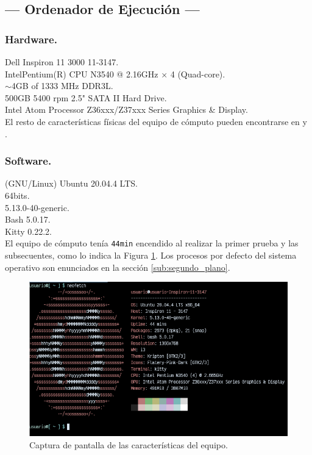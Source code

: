 \documentclass[11pt,a4paper]{article}
\begin{document}
\subsection{--- Ordenador de Ejecución ---} %
\label{sub:condiciones}
\begin{minipage}{0.5\linewidth}
	\subsubsection{Hardware.} %
	\label{subs:hardware}
	\ttfamily
	 Dell Inspiron 11 3000 11-3147. \\[2mm]
	 Intel\textregistered Pentium(R) CPU N3540 @ 2.16GHz × 4 (Quad-core). \\[2mm]
	 \(\sim\)4GB of 1333 MHz DDR3L. \\[2mm]
	 500GB 5400 rpm 2.5" SATA II Hard Drive. \\[2mm]
	 Intel Atom Processor Z36xxx/Z37xxx Series Graphics \& Display. \\[2mm]
	\normalfont
	El resto de características físicas del equipo de cómputo pueden encontrarse en  y .
\end{minipage}\hspace{5mm}
\begin{minipage}{0.5\linewidth}
	\subsubsection{Software.} %
	\label{subs:software}
	\ttfamily
	 (GNU/Linux) Ubuntu 20.04.4 LTS.\\[2mm]
	 64bits.\\[2mm]
	 5.13.0-40-generic.\\[2mm]
	 Bash 5.0.17.\\[2mm]
	 Kitty 0.22.2.\\[2mm]
	\normalfont
	El equipo de cómputo tenía \texttt{44min} encendido al realizar la primer prueba y las subsecuentes, como lo indica la Figura \ref{fig:caract}.
	Los procesos por defecto del sistema operativo son enunciados en la sección \ref{sub:segundo_plano}.
\end{minipage}
\newpage
\begin{figure}[hbt!]
	\centering
	\includegraphics[width= 0.8 \linewidth]{IMAGENES/1/caracteristicas_equipo.png}
	\caption{Captura de pantalla de las características del equipo.}
	\label{fig:caract}
\end{figure}
\end{document}
